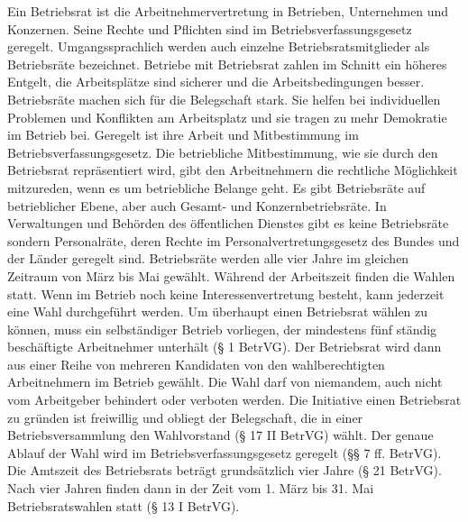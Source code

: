 Ein Betriebsrat ist die Arbeitnehmervertretung in Betrieben, Unternehmen und Konzernen. Seine Rechte und Pflichten sind im Betriebsverfassungsgesetz geregelt. Umgangssprachlich werden auch einzelne Betriebsratsmitglieder als Betriebsräte bezeichnet. 
\newline
Betriebe mit Betriebsrat zahlen im Schnitt ein höheres Entgelt, die Arbeitsplätze sind sicherer und die Arbeitsbedingungen besser. Betriebsräte machen sich für die Belegschaft stark. Sie helfen bei individuellen Problemen und Konflikten am Arbeitsplatz und sie tragen zu mehr Demokratie im Betrieb bei. Geregelt ist ihre Arbeit und Mitbestimmung im Betriebsverfassungsgesetz.
\newline
Die betriebliche Mitbestimmung, wie sie durch den Betriebsrat repräsentiert wird, gibt den Arbeitnehmern die rechtliche Möglichkeit mitzureden, wenn es um betriebliche Belange geht.
\newline
Es gibt Betriebsräte auf betrieblicher Ebene, aber auch Gesamt- und Konzernbetriebsräte. In Verwaltungen und Behörden des öffentlichen Dienstes gibt es keine Betriebsräte sondern Personalräte, deren Rechte im Personalvertretungsgesetz des Bundes und der Länder geregelt sind.
\newline 
Betriebsräte werden alle vier Jahre im gleichen Zeitraum von März bis Mai gewählt. 
Während der Arbeitszeit finden die Wahlen statt. 
Wenn im Betrieb noch keine Interessenvertretung besteht, kann jederzeit eine Wahl durchgeführt werden.
\newline 
Um überhaupt einen Betriebsrat wählen zu können, muss ein selbständiger Betrieb vorliegen, der mindestens fünf ständig beschäftigte Arbeitnehmer unterhält (§ 1 BetrVG). \newline
Der Betriebsrat wird dann aus einer Reihe von mehreren Kandidaten von den wahlberechtigten Arbeitnehmern im Betrieb gewählt. Die Wahl darf von niemandem, auch nicht vom Arbeitgeber behindert oder verboten werden.
Die Initiative einen Betriebsrat zu gründen ist freiwillig und obliegt der Belegschaft, die in einer Betriebsversammlung den Wahlvorstand (§ 17 II BetrVG) wählt. \newline
Der genaue Ablauf der Wahl wird im Betriebsverfassungsgesetz geregelt (§§ 7 ff. BetrVG). \newline
Die Amtszeit des Betriebsrats beträgt grundsätzlich vier Jahre (§ 21 BetrVG). Nach vier Jahren finden dann in der Zeit vom 1. März bis 31. Mai Betriebsratswahlen statt (§ 13 I BetrVG).